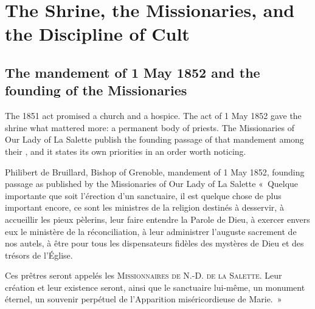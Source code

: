 \section{The Shrine, the Missionaries, and the Discipline of Cult}

\subsection{The mandement of 1 May 1852 and the founding of the
Missionaries}

The 1851 act promised a church and a hospice. The act of 1 May 1852
gave the shrine what mattered more: a permanent body of priests. The
Missionaries of Our Lady of La Salette publish the founding passage
of that mandement among their , and it
states its own priorities in an order worth noticing.

\begin{operativetext}{Philibert de Bruillard, Bishop of Grenoble,
mandement of 1 May 1852, founding passage as published by the
Missionaries of Our Lady of La Salette}
«~Quelque importante que soit l'érection d'un sanctuaire, il est
quelque chose de plus important encore, ce sont les ministres de la
religion destinés à desservir, à accueillir les pieux pèlerins, leur
faire entendre la Parole de Dieu, à exercer envers eux le ministère
de la réconciliation, à leur administrer l'auguste sacrement de nos
autels, à être pour tous les dispensateurs fidèles des mystères de
Dieu et des trésors de l'Église.\par
Ces prêtres seront appelés les \textsc{Missionnaires de N.-D. de la
Salette}. Leur création et leur existence seront, ainsi que le
sanctuaire lui-même, un monument éternel, un souvenir perpétuel de
l'Apparition miséricordieuse de Marie.~»
\end{operativetext}

